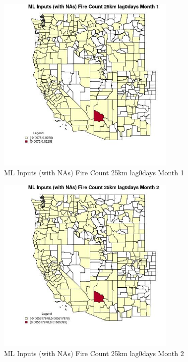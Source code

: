 \clearpage 

\begin{figure} 
\centering  
\includegraphics[width=0.77\textwidth]{Code_Outputs/Report_ML_input_PM25_Step4_part_e_de_duplicated_aves_compiled_2019-05-20wNAs_CountyFire_Count_25km_lag0daysmedianMonth1.jpg} 
\caption{\label{fig:Report_ML_input_PM25_Step4_part_e_de_duplicated_aves_compiled_2019-05-20wNAsCountyFire_Count_25km_lag0daysmedianMonth1}ML Inputs (with NAs) Fire Count 25km lag0days Month 1} 
\end{figure} 
 

\begin{figure} 
\centering  
\includegraphics[width=0.77\textwidth]{Code_Outputs/Report_ML_input_PM25_Step4_part_e_de_duplicated_aves_compiled_2019-05-20wNAs_CountyFire_Count_25km_lag0daysmedianMonth2.jpg} 
\caption{\label{fig:Report_ML_input_PM25_Step4_part_e_de_duplicated_aves_compiled_2019-05-20wNAsCountyFire_Count_25km_lag0daysmedianMonth2}ML Inputs (with NAs) Fire Count 25km lag0days Month 2} 
\end{figure} 
 

